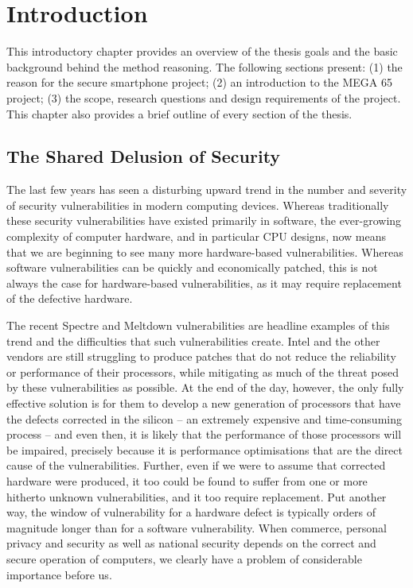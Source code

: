 
\chapter{Introduction} %

\label{Chapter1} %


This introductory chapter provides an overview of the thesis goals and the basic background behind the method reasoning. The following sections present: (1) the reason for the secure smartphone project; (2) an introduction to the MEGA 65 project; (3) the scope, research questions and design requirements of the project. This chapter also provides a brief outline of every section of the thesis. 

\section{The Shared Delusion of Security}

	The last few years has seen a disturbing upward trend in the number and severity of security vulnerabilities in modern computing devices. Whereas traditionally these security vulnerabilities have existed primarily in software, the ever-growing complexity of computer hardware, and in particular CPU designs, now means that we are beginning to see many more hardware-based vulnerabilities.  Whereas software vulnerabilities can be quickly and economically patched, this is not always the case for hardware-based vulnerabilities, as it may require replacement of the defective hardware.  

The recent Spectre and Meltdown vulnerabilities are headline examples of this trend and the difficulties that such vulnerabilities create. Intel and the other vendors are still struggling to produce patches that do not reduce the reliability or performance of their processors, while mitigating as much of the threat posed by these vulnerabilities as possible.  At the end of the day, however, the only fully effective solution is for them to develop a new generation of processors that have the defects corrected in the silicon – an extremely expensive and time-consuming process – and even then, it is likely that the performance of those processors will be impaired, precisely because it is performance optimisations that are the direct cause of the vulnerabilities.  Further, even if we were to assume that corrected hardware were produced, it too could be found to suffer from one or more hitherto unknown vulnerabilities, and it too require replacement.  Put another way, the window of vulnerability for a hardware defect is typically orders of magnitude longer than for a software vulnerability. When commerce, personal privacy and security as well as national security depends on the correct and secure operation of computers, we clearly have a problem of considerable importance before us.

